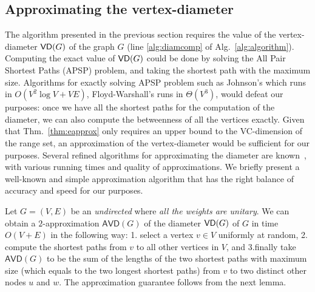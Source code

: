 \subsection{Approximating the vertex-diameter}\label{sec:diam}
The algorithm presented in the previous section requires the value of the
vertex-diameter $\mathsf{VD}(G)$ of the graph $G$ (line
\ref{alg:diamcomp} of Alg.~\ref{alg:algorithm}). 
Computing the exact value of $\mathsf{VD}(G)$ could be done by solving the All Pair
Shortest Paths (APSP) problem, and taking the shortest path with the maximum size.
Algorithms for exactly solving APSP problem such as Johnson's which runs in
$O(V^2\log V+VE)$, Floyd-Warshall's runs in $\Theta(V^3)$, would defeat our
purposes: once we have all the shortest paths for the computation of
the diameter, we can also compute the betweenness of all the vertices exactly. 
Given that Thm.~\ref{thm:eapprox} only requires an upper bound to the
VC-dimension of the range set, an approximation of the vertex-diameter would be
sufficient for our purposes. Several refined algorithms for approximating the
diameter are known~\citep{AingwordCIM99,BoitmanisFL06,RodittyW12}, with various
running times and quality of approximations. We briefly present a well-known and
simple approximation algorithm that has the right balance of accuracy and speed
for our purposes.

Let $G=(V,E)$ be an \emph{undirected} where \emph{all the weights are unitary}.
We can obtain a $2$-approximation $\mathsf{AVD}(G)$ of the diameter $\mathsf{VD}(G)$ of
$G$ in time $O(V+E)$ in the following way: 1. select a vertex $v\in V$ uniformly
at random, 2. compute the shortest paths from $v$ to all other vertices in $V$,
and 3.finally take $\mathsf{AVD}(G)$ to be the sum of the lengths of the two
shortest paths with maximum size (which equals to the two longest shortest
paths) from $v$ to two distinct other nodes $u$ and $w$. The approximation
guarantee follows from the next lemma.

